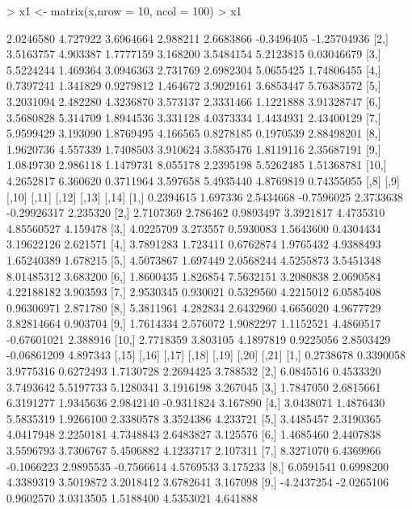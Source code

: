 \documentclass[12pt]{article}
\begin{document}
\begin{Schunk}
\begin{Sinput}
> x1 <- matrix(x,nrow = 10, ncol = 100) 
> x1
\end{Sinput}
\begin{Soutput}
           [,1]     [,2]      [,3]     [,4]      [,5]       [,6]        [,7]
 [1,] 2.0246580 4.727922 3.6964664 2.988211 2.6683866 -0.3496405 -1.25704936
 [2,] 3.5163757 4.903387 1.7777159 3.168200 3.5484154  5.2123815  0.03046679
 [3,] 5.5224244 1.469364 3.0946363 2.731769 2.6982304  5.0655425  1.74806455
 [4,] 0.7397241 1.341829 0.9279812 1.464672 3.9029161  3.6853447  5.76383572
 [5,] 3.2031094 2.482280 4.3236870 3.573137 2.3331466  1.1221888  3.91328747
 [6,] 3.5680828 5.314709 1.8944536 3.331128 4.0373334  1.4434931  2.43400129
 [7,] 5.9599429 3.193090 1.8769495 4.166565 0.8278185  0.1970539  2.88498201
 [8,] 1.9620736 4.557339 1.7408503 3.910624 3.5835476  1.8119116  2.35687191
 [9,] 1.0849730 2.986118 1.1479731 8.055178 2.2395198  5.5262485  1.51368781
[10,] 4.2652817 6.360620 0.3711964 3.597658 5.4935440  4.8769819  0.74355055
           [,8]     [,9]     [,10]      [,11]     [,12]       [,13]    [,14]
 [1,] 0.2394615 1.697336 2.5434668 -0.7596025 2.3733638 -0.29926317 2.235320
 [2,] 2.7107369 2.786462 0.9893497  3.3921817 4.4735310  4.85560527 4.159478
 [3,] 4.0225709 3.273557 0.5930083  1.5643600 0.4304434  3.19622126 2.621571
 [4,] 3.7891283 1.723411 0.6762874  1.9765432 4.9388493  1.65240389 1.678215
 [5,] 4.5073867 1.697449 2.0568244  4.5255873 3.5451348  8.01485312 3.683200
 [6,] 1.8600435 1.826854 7.5632151  3.2080838 2.0690584  4.22188182 3.903593
 [7,] 2.9530345 0.930021 0.5329560  4.2215012 6.0585408  0.96306971 2.871780
 [8,] 5.3811961 4.282834 2.6432960  4.6656020 4.9677729  3.82814664 0.903704
 [9,] 1.7614334 2.576072 1.9082297  1.1152521 4.4860517 -0.67601021 2.388916
[10,] 2.7718359 3.803105 4.1897819  0.9225056 2.8503429 -0.06861209 4.897343
           [,15]      [,16]      [,17]     [,18]      [,19]      [,20]    [,21]
 [1,]  0.2738678  0.3390058  3.9775316 0.6272493  1.7130728  2.2694425 3.788532
 [2,]  6.0845516  0.4533320  3.7493642 5.5197733  5.1280341  3.1916198 3.267045
 [3,]  1.7847050  2.6815661  6.3191277 1.9345636  2.9842140 -0.9311824 3.167890
 [4,]  3.0438071  1.4876430  5.5835319 1.9266100  2.3380578  3.3524386 4.233721
 [5,]  3.4485457  2.3190365  4.0417948 2.2250181  4.7348843  2.6483827 3.125576
 [6,]  1.4685460  2.4407838  3.5596793 3.7306767  5.4506882  4.1233717 2.107311
 [7,]  8.3271070  6.4369966 -0.1066223 2.9895535 -0.7566614  4.5769533 3.175233
 [8,]  6.0591541  0.6998200  4.3389319 3.5019872  3.2018412  3.6782641 3.167098
 [9,] -4.2437254 -2.0265106  0.9602570 3.0313505  1.5188400  4.5353021 4.641888

\end{Soutput}
\end{Schunk}
\end{document}
